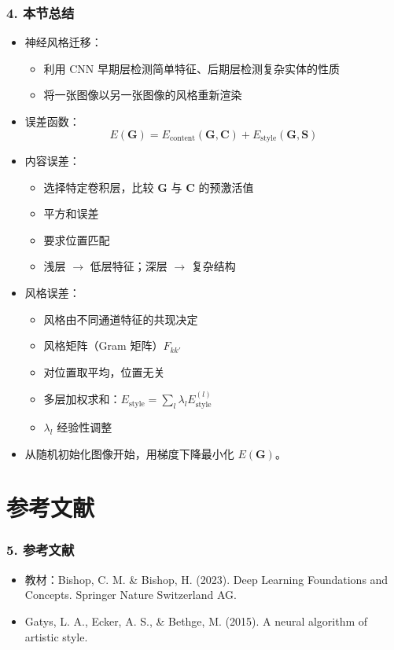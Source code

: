\documentclass[t,aspectratio=169]{beamer} %
\begin{document}
\begin{frame}[allowframebreaks]
    \frametitle{4. 本节总结}
    \begin{itemize}
        \item \alert{神经风格迁移}：
        \begin{itemize}
            \item 利用 CNN 早期层检测简单特征、后期层检测复杂实体的性质
            \item 将一张图像以另一张图像的风格重新渲染
        \end{itemize}
        \item \alert{误差函数}：
        \begin{equation}
            E(\mathbf{G}) = E_{\text{content}}(\mathbf{G}, \mathbf{C}) + E_{\text{style}}(\mathbf{G}, \mathbf{S})
        \end{equation}
        \item \alert{内容误差}：
        \begin{itemize}
            \item 选择特定卷积层，比较 $\mathbf{G}$ 与 $\mathbf{C}$ 的预激活值
            \item 平方和误差
            \item 要求\alert{位置匹配}
            \item 浅层 $\to$ 低层特征；深层 $\to$ 复杂结构
        \end{itemize}
        \item \alert{风格误差}：
        \begin{itemize}
            \item 风格由不同通道特征的\alert{共现}决定
            \item 风格矩阵（Gram 矩阵）$F_{kk'}$
            \item 对位置\alert{取平均}，位置无关
            \item 多层加权求和：$E_{\text{style}} = \sum_l \lambda_l E_{\text{style}}^{(l)}$
            \item $\lambda_l$ 经验性调整
        \end{itemize}
        \item 从随机初始化图像开始，用\alert{梯度下降}最小化 $E(\mathbf{G})$。
    \end{itemize}
\end{frame}

\section{参考文献}

\begin{frame}
    \frametitle{5. 参考文献}
    \begin{itemize}
        \item 教材：Bishop, C. M. \& Bishop, H. (2023). Deep Learning Foundations and Concepts. Springer Nature Switzerland AG.
        \item Gatys, L. A., Ecker, A. S., \& Bethge, M. (2015). A neural algorithm of artistic style.
    \end{itemize}
\end{frame}
\end{document}
